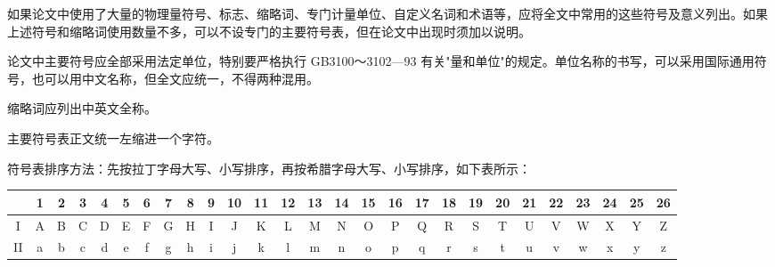 \documentclass[UTF8, scheme=chinese, openany, oneside]{ctexbook}
\begin{document}
\vspace{0.6cm}

{
\noindent\hspace{1em}如果论文中使用了大量的物理量符号、标志、缩略词、专门计量单位、自定义名词和术语等，应将全文中常用的这些符号及意义列出。如果上述符号和缩略词使用数量不多，可以不设专门的主要符号表，但在论文中出现时须加以说明。

\noindent\hspace{1em}论文中主要符号应全部采用法定单位，特别要严格执行 GB3100～3102—93 有关"量和单位"的规定。单位名称的书写，可以采用国际通用符号，也可以用中文名称，但全文应统一，不得两种混用。

\noindent\hspace{1em}缩略词应列出中英文全称。

\noindent\hspace{1em}主要符号表正文统一左缩进一个字符。

\noindent\hspace{1em}符号表排序方法：先按拉丁字母大写、小写排序，再按希腊字母大写、小写排序，如下表所示：
}

\vspace{0.3cm}

\begin{center}
\setlength{\tabcolsep}{3.3pt}
\begin{tabular}{|c|cccccccccccccccccccccccccc|}
\hline
 & \color{red}1 & \color{red}2 & \color{red}3 & \color{red}4 & \color{red}5 & \color{red}6 & \color{red}7 & \color{red}8 & \color{red}9 & \color{red}10 & \color{red}11 & \color{red}12 & \color{red}13 & \color{red}14 & \color{red}15 & \color{red}16 & \color{red}17 & \color{red}18 & \color{red}19 & \color{red}20 & \color{red}21 & \color{red}22 & \color{red}23 & \color{red}24 & \color{red}25 & \color{red}26 \\ \hline
\color{red}I & A & B & C & D & E & F & G & H & I & J & K & L & M & N & O & P & Q & R & S & T & U & V & W & X & Y & Z \\ 
\color{red}II & a & b & c & d & e & f & g & h & i & j & k & l & m & n & o & p & q & r & s & t & u & v & w & x & y & z \\ \hline
\end{tabular}
\end{center}

\end{document}
